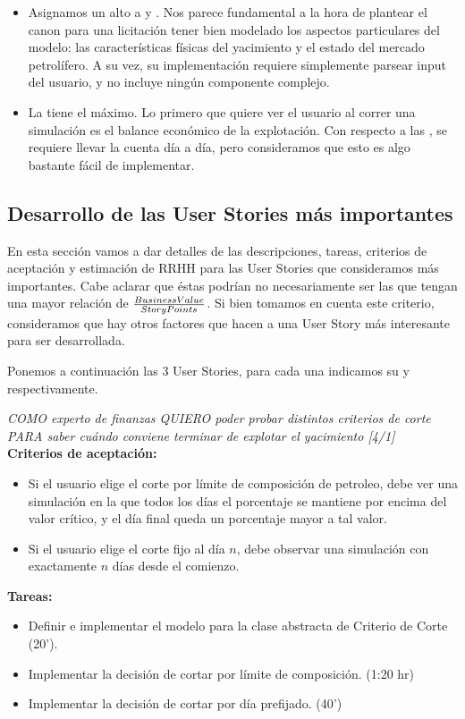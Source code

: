 \begin{itemize}
    \item Asignamos un alto \BV{} a  y . Nos parece fundamental a la hora de plantear el canon para una licitación tener bien modelado los aspectos particulares del modelo: las características físicas del yacimiento y el estado del mercado petrolífero. A su vez, su implementación requiere simplemente parsear input del usuario, y no incluye ningún componente complejo.
    
    \item La  tiene el \BV{} máximo. Lo primero que quiere ver el usuario al correr una simulación es el balance económico de la explotación. Con respecto a las \SP{}, se requiere llevar la cuenta día a día, pero consideramos que esto es algo bastante fácil de implementar. 
\end{itemize}

\newpage
\subsection{Desarrollo de las User Stories más importantes}

En esta sección vamos a dar detalles de las descripciones, tareas, criterios de aceptación y estimación de RRHH para las User Stories que consideramos más importantes. Cabe aclarar que éstas podrían no necesariamente ser las que tengan una mayor relación de \( \frac{Business Value{}}{Story Points{}} \). Si bien tomamos en cuenta este criterio, consideramos que hay otros factores que hacen a una User Story más interesante para ser desarrollada. 

Ponemos a continuación las 3 User Stories, para cada una indicamos su 
\BV{} y \SP{} respectivamente. 

\begin{tcolorbox}
\textit{COMO experto de finanzas QUIERO poder probar distintos criterios de corte PARA saber cuándo conviene terminar de explotar el yacimiento [4/1]}\\

\textbf{Criterios de aceptación:}
\begin{itemize}
	\item Si el usuario elige el corte por límite de composición de petroleo, debe ver una simulación en la que todos los días el porcentaje se mantiene por encima del valor crítico, y el día final queda un porcentaje mayor a tal valor.
    \item Si el usuario elige el corte fijo al día $n$, debe observar una simulación con exactamente $n$ días desde el comienzo.
\end{itemize}

\textbf{Tareas:}
\begin{itemize}
	\item Definir e implementar el modelo para la clase abstracta de 
    Criterio de Corte (20').
    \item Implementar la decisión de cortar por límite de composición. (1:20 hr)
    \item Implementar la decisión de cortar por día prefijado. (40')
\end{itemize}
\end{tcolorbox}

